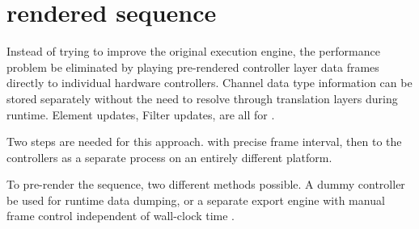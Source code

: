 \section{ rendered sequence}

Instead of trying to improve the original execution engine, the performance problem  be eliminated by playing pre-rendered controller layer data frames directly to individual hardware controllers. Channel data type information can be stored separately without the need to resolve through translation layers during runtime. Element updates, Filter updates,   are all  for .

Two steps are needed for this approach.  with  precise frame interval, then  to the controllers as a separate process on an entirely different platform.

To pre-render the sequence, two different methods  possible. A dummy controller  be used for runtime data dumping, or a separate export engine with manual frame control independent of wall-clock time . 
